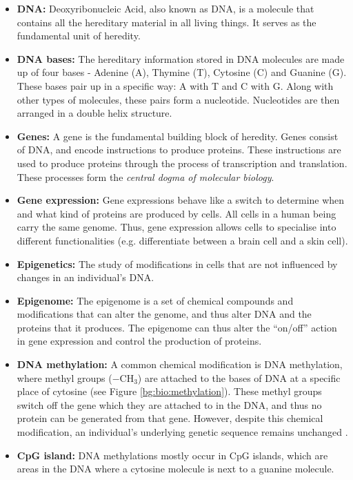 \documentclass[12pt, twoside, a4paper]{report}
\begin{document}
\begin{itemize}
\item \textbf{DNA:} Deoxyribonucleic Acid, also known as DNA, is a molecule that contains all the hereditary material in all living things. It serves as the fundamental unit of heredity.

\item \textbf{DNA bases:} The hereditary information stored in DNA molecules are made up of four bases - Adenine (A), Thymine (T), Cytosine (C) and Guanine (G). These bases pair up in a specific way: A with T and C with G. Along with other types of molecules, these pairs form a nucleotide. Nucleotides are then arranged in a double helix structure.

\item \textbf{Genes:} A gene is the fundamental building block of heredity. Genes consist of DNA, and encode instructions to produce proteins. These instructions are used to produce proteins through the process of transcription and translation. These processes form the \textit{central dogma of molecular biology}.

\item \textbf{Gene expression:} Gene expressions behave like a switch to determine when and what kind of proteins are produced by cells. All cells in a human being carry the same genome. Thus, gene expression allows cells to specialise into different functionalities (e.g. differentiate between a brain cell and a skin cell).

\item \textbf{Epigenetics:} The study of modifications in cells that are not influenced by changes in an individual's DNA.

\item \textbf{Epigenome:} The epigenome is a set of chemical compounds and modifications that can alter the genome, and thus alter DNA and the proteins that it produces. The epigenome can thus alter the ``on/off'' action in gene expression and control the production of proteins.


\item \textbf{DNA methylation:} A common chemical modification is DNA methylation, where methyl groups ($-$CH$_3$) are attached to the bases of DNA at a specific place of cytosine (see Figure \ref{bg:bio:methylation}). These methyl groups switch off the gene which they are attached to in the DNA, and thus no protein can be generated from that gene. However, despite this chemical modification, an individual's underlying genetic sequence remains unchanged \cite{RefWorks:249}.

\item \textbf{CpG island:} DNA methylations mostly occur in CpG islands, which are areas in the DNA where a cytosine molecule is next to a guanine molecule. 
\end{itemize}
\end{document}
